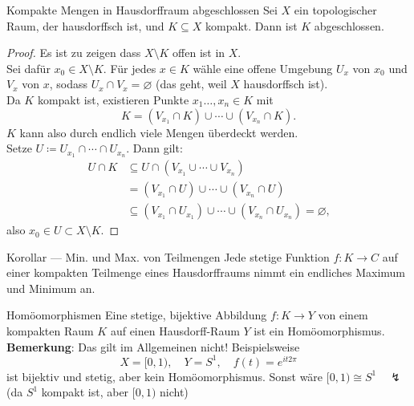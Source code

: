 \begin{lemma}{Kompakte Mengen in Hausdorffraum abgeschlossen}
  Sei $ X $ ein topologischer Raum, der hausdorffsch ist, und $ K \subseteq X $ kompakt. Dann ist $ K $ abgeschlossen.
  \begin{proof}
    Es ist zu zeigen dass $ X \setminus K $ offen ist in $ X $. \\
    Sei dafür $ x_0 \in X \setminus K $. Für jedes $ x \in K $ wähle eine offene Umgebung $ U_x $ von $ x_0 $ und $ V_x $ von $ x $, sodass $ U_x \cap V_x = \varnothing $ (das geht, weil $ X $ hausdorffsch ist). \\
    Da $ K $ kompakt ist, existieren Punkte $ x_1 \dots, x_n \in K $ mit
    \begin{equation*}
      K = (V_{x_1} \cap K) \cup \cdots \cup (V_{x_n} \cap K)\text{.}
    \end{equation*}
    $ K $ kann also durch endlich viele Mengen überdeckt werden. \\
    Setze $ U \coloneqq U_{x_1} \cap \cdots \cap U_{x_n} $. Dann gilt:
    \begin{align*}
      U \cap K &\subseteq U \cap (V_{x_1} \cup \cdots \cup V_{x_n}) \\
       &= (V_{x_1} \cap U) \cup \cdots \cup (V_{x_n} \cap U) \\
       &\subseteq (V_{x_1} \cap U_{x_1}) \cup \cdots \cup (V_{x_n} \cap U_{x_n}) = \varnothing\text{,}
    \end{align*}
    also $ x_0 \in U \subset X \setminus K $.
  \end{proof}
\end{lemma}

\begin{bla}{Korollar --- Min. und Max. von Teilmengen}
  Jede stetige Funktion $ f : K \to C $ auf einer kompakten Teilmenge eines Hausdorffraums nimmt ein endliches Maximum und Minimum an.
\end{bla}

\begin{theorem}{Homöomorphismen}
  Eine stetige, bijektive Abbildung $ f : K \to Y $ von einem kompakten Raum $ K $ auf einen Hausdorff-Raum $ Y $ ist ein Homöomorphismus. \\
  \textbf{Bemerkung}: Das gilt im Allgemeinen nicht! Beispielsweise
  \begin{equation*}
    X = [0,1), \quad Y = S^1, \quad f(t) = e^{it2\pi}
  \end{equation*}
  ist bijektiv und stetig, aber kein Homöomorphismus. Sonst wäre $ [0,1) \cong S^1 \quad \lightning $ (da $ S^1 $ kompakt ist, aber $ [0,1) $ nicht)
\end{theorem}